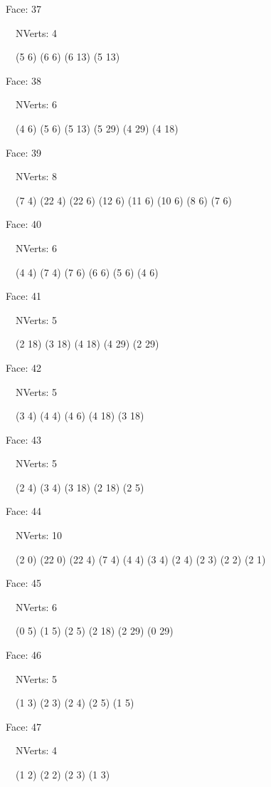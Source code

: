 \documentclass{article}
\begin{document}
{\footnotesize 

Face: 37

\   \    NVerts: 4

 \   \   (5 6) (6 6) (6 13) (5 13)}

{\footnotesize 

Face: 38

\   \    NVerts: 6

 \   \   (4 6) (5 6) (5 13) (5 29) (4 29) (4 18)}

{\footnotesize 

Face: 39

\   \    NVerts: 8

 \   \   (7 4) (22 4) (22 6) (12 6) (11 6) (10 6) (8 6) (7 6)}

{\footnotesize 

Face: 40

\   \    NVerts: 6

 \   \   (4 4) (7 4) (7 6) (6 6) (5 6) (4 6)}

{\footnotesize 

Face: 41

\   \    NVerts: 5

 \   \   (2 18) (3 18) (4 18) (4 29) (2 29)}

{\footnotesize 

Face: 42

\   \    NVerts: 5

 \   \   (3 4) (4 4) (4 6) (4 18) (3 18)}

{\footnotesize 

Face: 43

\   \    NVerts: 5

 \   \   (2 4) (3 4) (3 18) (2 18) (2 5)}

{\footnotesize 

Face: 44

\   \    NVerts: 10

 \   \   (2 0) (22 0) (22 4) (7 4) (4 4) (3 4) (2 4) (2 3) (2 2) (2 1)}

{\footnotesize 

Face: 45

\   \    NVerts: 6

 \   \   (0 5) (1 5) (2 5) (2 18) (2 29) (0 29)}

{\footnotesize 

Face: 46

\   \    NVerts: 5

 \   \   (1 3) (2 3) (2 4) (2 5) (1 5)}

{\footnotesize 

Face: 47

\   \    NVerts: 4

 \   \   (1 2) (2 2) (2 3) (1 3)}
\end{document}
